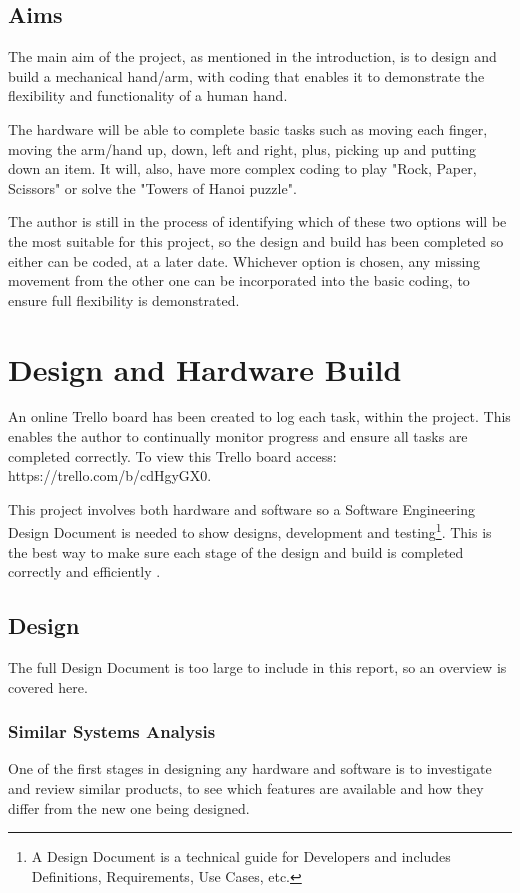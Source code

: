 \documentclass[progress]{cmpreport}
\begin{document}
\subsection{Aims}
The main aim of the project, as mentioned in the introduction, is to design and build a mechanical hand/arm, with coding that enables it to demonstrate the flexibility and functionality of a human hand. 

The hardware will be able to complete basic tasks such as moving each finger, moving the arm/hand up, down, left and right, plus, picking up and putting down an item. It will, also, have more complex coding to play "Rock, Paper, Scissors" or solve the "Towers of Hanoi puzzle". 

The author is still in the process of identifying which of these two options will be the most suitable for this project, so the design and build has been completed so either can be coded, at a later date. Whichever option is chosen, any missing movement from the other one can be incorporated into the basic coding, to ensure full flexibility is demonstrated. 

\section{Design and Hardware Build}

An online Trello board has been created to log each task, within the project. This enables the author to continually monitor progress and ensure all tasks are completed correctly. To view this Trello board access: https://trello.com/b/cdHgyGX0.

This project involves both hardware and software so a Software Engineering Design Document is needed to show designs, development and testing\footnote{A Design Document is a technical guide for Developers and includes Definitions, Requirements, Use Cases, etc.}. This is the best way to make sure each stage of the design and build is completed correctly and efficiently \citep{mcelrath}.

\subsection{Design}

The full Design Document is too large to include in this report, so an overview is covered here.

\subsubsection{Similar Systems Analysis}
One of the first stages in designing any hardware and software is to investigate and review similar products, to see which features are available and how they differ from the new one being designed. 
\end{document}
